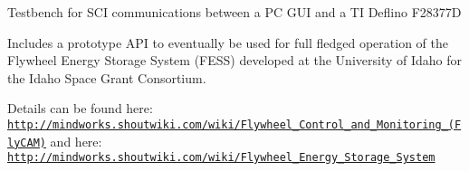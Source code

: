 Testbench for S\+CI communications between a PC G\+UI and a TI Deflino F28377D

Includes a prototype A\+PI to eventually be used for full fledged operation of the Flywheel Energy Storage System (F\+E\+SS) developed at the University of Idaho for the Idaho Space Grant Consortium.

Details can be found here\+: \href{http://mindworks.shoutwiki.com/wiki/Flywheel_Control_and_Monitoring_(FlyCAM)}{\tt http\+://mindworks.\+shoutwiki.\+com/wiki/\+Flywheel\+\_\+\+Control\+\_\+and\+\_\+\+Monitoring\+\_\+(\+Fly\+C\+A\+M)} and here\+: \href{http://mindworks.shoutwiki.com/wiki/Flywheel_Energy_Storage_System}{\tt http\+://mindworks.\+shoutwiki.\+com/wiki/\+Flywheel\+\_\+\+Energy\+\_\+\+Storage\+\_\+\+System} 